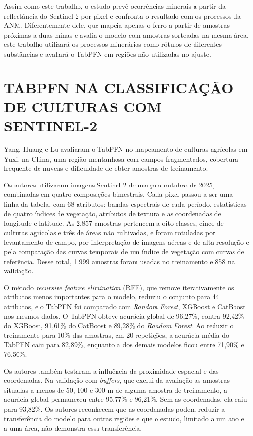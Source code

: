 Assim como este trabalho, o estudo prevê ocorrências minerais a partir da reflectância do Sentinel-2 por pixel e confronta o resultado com os processos da ANM. Diferentemente dele, que mapeia apenas o ferro a partir de amostras próximas a duas minas e avalia o modelo com amostras sorteadas na mesma área, este trabalho utilizará os processos minerários como rótulos de diferentes substâncias e avaliará o TabPFN em regiões não utilizadas no ajuste.

\section{TABPFN NA CLASSIFICAÇÃO DE CULTURAS COM SENTINEL-2}

Yang, Huang e Lu \cite{yang2026} avaliaram o TabPFN no mapeamento de culturas agrícolas em Yuxi, na China, uma região montanhosa com campos fragmentados, cobertura frequente de nuvens e dificuldade de obter amostras de treinamento.

Os autores utilizaram imagens Sentinel-2 de março a outubro de 2025, combinadas em quatro composições bimestrais. Cada pixel passou a ser uma linha da tabela, com 68 atributos: bandas espectrais de cada período, estatísticas de quatro índices de vegetação, atributos de textura e as coordenadas de longitude e latitude. As 2.857 amostras pertencem a oito classes, cinco de culturas agrícolas e três de áreas não cultivadas, e foram rotuladas por levantamento de campo, por interpretação de imagens aéreas e de alta resolução e pela comparação das curvas temporais de um índice de vegetação com curvas de referência. Desse total, 1.999 amostras foram usadas no treinamento e 858 na validação.

O método \textit{recursive feature elimination} (RFE), que remove iterativamente os atributos menos importantes para o modelo, reduziu o conjunto para 44 atributos, e o TabPFN foi comparado com \textit{Random Forest}, XGBoost e CatBoost nos mesmos dados. O TabPFN obteve acurácia global de 96,27\%, contra 92,42\% do XGBoost, 91,61\% do CatBoost e 89,28\% do \textit{Random Forest}. Ao reduzir o treinamento para 10\% das amostras, em 20 repetições, a acurácia média do TabPFN caiu para 82,89\%, enquanto a dos demais modelos ficou entre 71,90\% e 76,50\%.

Os autores também testaram a influência da proximidade espacial e das coordenadas. Na validação com \textit{buffers}, que exclui da avaliação as amostras situadas a menos de 50, 100 e 300 m de alguma amostra de treinamento, a acurácia global permaneceu entre 95,77\% e 96,21\%. Sem as coordenadas, ela caiu para 93,82\%. Os autores reconhecem que as coordenadas podem reduzir a transferência do modelo para outras regiões e que o estudo, limitado a um ano e a uma área, não demonstra essa transferência.

